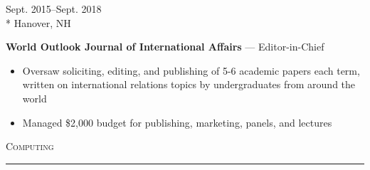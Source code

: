 \documentclass[a4paper,9pt]{article}
\begin{document}
\vspace{-3ex}
\begin{minipage}[t]{0.20\linewidth}
	\begin{small}
		\begin{spacing}{1.00}
			\begin{flushright}
				Sept. 2015--Sept. 2018
				\\*
				\vspace*{2.5pt}
				Hanover, NH
			\end{flushright}
		\end{spacing}
	\end{small}
\end{minipage}
\hspace{4mm}
\begin{minipage}[t]{0.75\linewidth}
	\begin{small}
		\begin{spacing}{1.00}
			\begin{flushleft}
				\textbf{World Outlook Journal of International Affairs} --- Editor-in-Chief
                \begin{itemize}[itemsep=0pt,topsep=2.5pt,leftmargin=*]
					\item Oversaw soliciting, editing, and publishing of 5-6 academic papers each term, written on international relations
topics by undergraduates from around the world
					\item Managed \$2,000 budget for publishing, marketing, panels, and lectures
				\end{itemize}
			\end{flushleft}
		\end{spacing}
	\end{small}
\end{minipage}

\vspace{-6ex}
\vspace*{25pt}

\begin{Large}
	\textsc{Computing}
\end{Large}
\vspace*{5pt}
\hrule
\vspace*{5pt}
\end{document}

